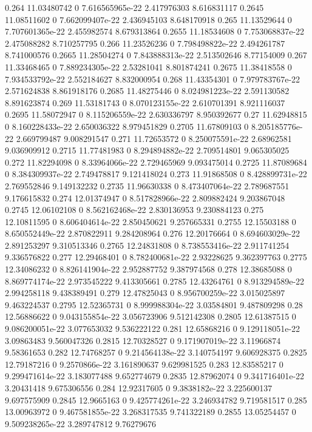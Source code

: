 {0.264 11.03480742 0 7.616565965e-22 2.417976303 8.616831117
0.2645 11.08511602 0 7.662099407e-22 2.436945103 8.648170918
0.265 11.13529644 0 7.707601365e-22 2.455982574 8.679313864
0.2655 11.18534608 0 7.753068837e-22 2.475088282 8.710257795
0.266 11.23526236 0 7.798498822e-22 2.494261787 8.741000576
0.2665 11.28504274 0 7.843888313e-22 2.513502646 8.77154009
0.267 11.33468465 0 7.889234305e-22 2.53281041 8.801874241
0.2675 11.38418558 0 7.934533792e-22 2.552184627 8.832000954
0.268 11.43354301 0 7.979783767e-22 2.571624838 8.861918176
0.2685 11.48275446 0 8.024981223e-22 2.591130582 8.891623874
0.269 11.53181743 0 8.070123155e-22 2.610701391 8.921116037
0.2695 11.58072947 0 8.115206559e-22 2.630336797 8.950392677
0.27 11.62948815 0 8.160228433e-22 2.650036322 8.979451829
0.2705 11.67809103 0 8.205185776e-22 2.669799487 9.008291547
0.271 11.72653572 0 8.250075591e-22 2.68962581 9.036909912
0.2715 11.77481983 0 8.294894882e-22 2.709514801 9.065305025
0.272 11.82294098 0 8.33964066e-22 2.729465969 9.093475014
0.2725 11.87089684 0 8.384309937e-22 2.749478817 9.121418024
0.273 11.91868508 0 8.428899731e-22 2.769552846 9.149132232
0.2735 11.96630338 0 8.473407064e-22 2.789687551 9.176615832
0.274 12.01374947 0 8.517828966e-22 2.809882424 9.203867048
0.2745 12.06102108 0 8.562162468e-22 2.830136953 9.230884123
0.275 12.10811595 0 8.606404614e-22 2.850450621 9.257665331
0.2755 12.15503188 0 8.650552449e-22 2.870822911 9.284208964
0.276 12.20176664 0 8.694603029e-22 2.891253297 9.310513346
0.2765 12.24831808 0 8.738553416e-22 2.911741254 9.336576822
0.277 12.29468401 0 8.782400681e-22 2.93228625 9.362397763
0.2775 12.34086232 0 8.826141904e-22 2.952887752 9.387974568
0.278 12.38685088 0 8.869774174e-22 2.973545222 9.413305661
0.2785 12.43264761 0 8.913294589e-22 2.994258118 9.438389491
0.279 12.47825043 0 8.956700259e-22 3.015025897 9.463224537
0.2795 12.52365731 0 8.999988304e-22 3.03584801 9.487809298
0.28 12.56886622 0 9.043155854e-22 3.056723906 9.512142308
0.2805 12.61387515 0 9.086200051e-22 3.077653032 9.536222122
0.281 12.65868216 0 9.129118051e-22 3.09863483 9.560047326
0.2815 12.70328527 0 9.171907019e-22 3.11966874 9.58361653
0.282 12.74768257 0 9.214564138e-22 3.140754197 9.606928375
0.2825 12.79187216 0 9.2570866e-22 3.161890637 9.629981525
0.283 12.83585217 0 9.299471614e-22 3.183077488 9.652774679
0.2835 12.87962074 0 9.341716401e-22 3.20431418 9.675306556
0.284 12.92317605 0 9.3838182e-22 3.225600137 9.697575909
0.2845 12.9665163 0 9.425774261e-22 3.246934782 9.719581517
0.285 13.00963972 0 9.467581855e-22 3.268317535 9.741322189
0.2855 13.05254457 0 9.509238265e-22 3.289747812 9.76279676
}

